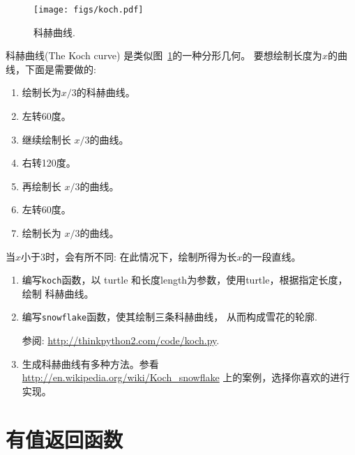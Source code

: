 \documentclass[10pt]{book}
\begin{document}
\begin{figure}
\centerline
{\texttt{[image: figs/koch.pdf]}}
\caption{科赫曲线.}
\label{fig.koch}
\end{figure}

\begin{exercise}

科赫曲线(The Koch curve) 是类似图~\ref{fig.koch}的一种分形几何。
要想绘制长度为$x$的曲线，下面是需要做的:

\begin{enumerate}

\item 绘制长为$x/3$的科赫曲线。

\item 左转60度。

\item 继续绘制长 $x/3$的曲线。

\item 右转120度。

\item 再绘制长 $x/3$的曲线。

\item 左转60度。

\item 绘制长为 $x/3$的曲线。

\end{enumerate}

当$x$小于3时，会有所不同:  在此情况下，绘制所得为长$x$的一段直线。

\begin{enumerate}

\item 编写{\tt koch}函数，以 turtle 和长度length为参数，使用turtle，根据指定长度，绘制
科赫曲线。

\item 编写{\tt snowflake}函数，使其绘制三条科赫曲线，
从而构成雪花的轮廓.

参阅: \url{http://thinkpython2.com/code/koch.py}.

\item 生成科赫曲线有多种方法。参看
\url{http://en.wikipedia.org/wiki/Koch_snowflake} 上的案例，选择你喜欢的进行实现。


\end{enumerate}
\end{exercise}


\chapter{有值返回函数}
\label{fruitchap}
\end{document}
